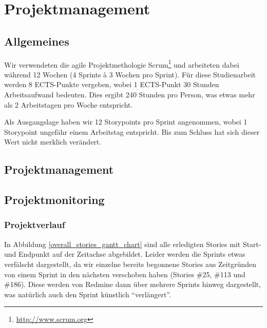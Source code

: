 \chapter{Projektmanagement}
\label{projektmanagement}

\section{Allgemeines}
Wir verwendeten die agile Projektmethologie Scrum\footnote{\url{http://www.scrum.org}} und arbeiteten dabei während 12 Wochen (4 Sprints à 3 Wochen pro Sprint).
Für diese Studienarbeit werden 8 ECTS-Punkte vergeben, wobei 1 ECTS-Punkt 30 Stunden Arbeitsaufwand bedeuten.
Dies ergibt 240 Stunden pro Person, was etwas mehr als 2 Arbeitstagen pro Woche entspricht.

Als Ausgangslage haben wir 12 Storypoints pro Sprint angenommen, wobei 1 Storypoint ungefähr einem Arbeitstag entspricht. Bis zum Schluss hat sich dieser Wert nicht merklich verändert.

\section{Projektmanagement}











\section{Projektmonitoring}

\subsection{Projektverlauf}
In Abbildung \ref{overall_stories_gantt_chart} sind alle erledigten Stories mit Start- und Endpunkt auf der Zeitachse abgebildet. Leider werden die Sprints etwas verfälscht dargestellt, da wir einzelne bereits begonnene Stories aus Zeitgründen von einem Sprint in den nächsten verschoben haben (Stories \#25, \#113 und \#186). Diese werden von Redmine dann über mehrere Sprints hinweg dargestellt, was natürlich auch den Sprint künstlich "`verlängert"'.


